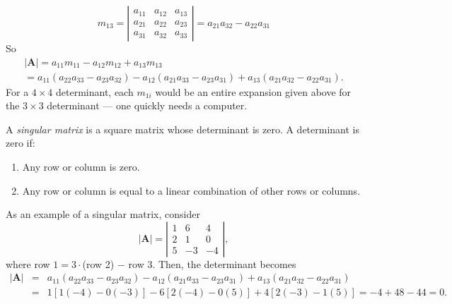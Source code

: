 \begin{equation}
m_{13} = \left| \begin{array}{ccc}
a_{11} & a_{12} & a_{13}\\
a_{21} & a_{22} & a_{23}\\
a_{31} & a_{32} & a_{33}
\end{array} \right |
= a_{21}a_{32} - a_{22}a_{31}
\end{equation}
So
\begin{equation}
\begin{array}{c}
|\mathbf{A}| = a_{11}m_{11} - a_{12}m_{12} + a_{13}m_{13}	 \\
= a_{11}(a_{22}a_{33} - a_{23}a_{32}) - a_{12}(a_{21}a_{33} - a_{23}a_{31}) + a_{13}(a_{21}a_{32} - a_{22}a_{31}).
\end{array}
\end{equation}
For a $4 \times 4$ determinant, each $m_{1i}$ would be an entire expansion given above for the 
$3 \times 3$ 
determinant --- one quickly needs a computer.

A \emph{singular matrix} is a square matrix whose determinant is zero. A determinant is zero if:
\begin{enumerate}
\item Any row or column is zero.
\item Any row or column is equal to a linear combination of other rows or columns.
\end{enumerate}
As an example of a singular matrix, consider
\begin{equation}
|{\mathbf A}| = \left | \begin{array}{ccc} 1 & 6 & 4 \\
2 & 1 & 0 \\
5 & -3 & -4 
\end{array} \right |,
\end{equation}
where row $1 = 3\cdot$(row 2) $-$ row 3.  Then, the determinant becomes
\begin{equation}
\begin{array}{ccl}
|\mathbf{A}| & = & a_{11}(a_{22}a_{33}-a_{23}a_{32})-a_{12}(a_{21}a_{33}-a_{23}a_{31})+a_{13}(a_{21}a_{32}-a_{22}a_{31})     \\
& = & 1[1(-4)-0(-3)]-6[2(-4)-0(5)]+4[2(-3)-1(5)]=-4+48-44=0.  \\
\end{array}
\end{equation}

